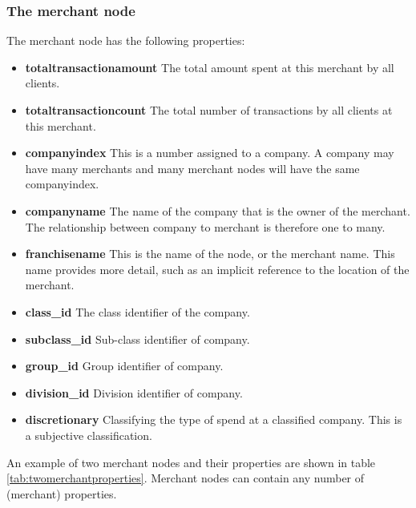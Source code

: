 \subsubsection{The merchant node}

The merchant node has the following properties:

\begin{itemize}

  \item \textbf{totaltransactionamount} The total amount spent at this merchant by all clients.
  \item \textbf{totaltransactioncount} The total number of transactions by all clients at this merchant.
  \item \textbf{companyindex} This is a number assigned to a company.  A company may have many merchants and many merchant nodes will have the same companyindex.
  \item \textbf{companyname} The name of the company that is the owner of the merchant.  The relationship between company to merchant is therefore one to many.
  \item \textbf{franchisename} This is the name of the node, or the merchant name.  This name provides more detail, such as an implicit reference to the location of the merchant.
 \item \textbf{class\_id} The class identifier of the company.
  \item \textbf{subclass\_id} Sub-class identifier of company.
  \item \textbf{group\_id} Group identifier of company.
  \item \textbf{division\_id} Division identifier of company.
  \item \textbf{discretionary} Classifying the type of spend at a classified company.  This is a subjective classification.
\end{itemize}

An example of two merchant nodes and their properties are shown in table \ref{tab:twomerchantproperties}.  Merchant nodes can contain any number of (merchant) properties.

